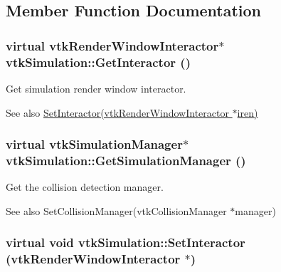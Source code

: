 \subsection{Member Function Documentation}
\hypertarget{classvtkSimulation_a80ce57f6226a646fd8faf2fac1767a64}{
\subsubsection[{GetInteractor}]{\setlength{\rightskip}{0pt plus 5cm}virtual vtkRenderWindowInteractor$\ast$ vtkSimulation::GetInteractor ()}}
\label{classvtkSimulation_a80ce57f6226a646fd8faf2fac1767a64}


Get simulation render window interactor. 

\begin{DoxySeeAlso}{See also}
\hyperlink{classvtkSimulation_ac735eaac690e6ca27d5c64131f495a26}{SetInteractor(vtkRenderWindowInteractor $\ast$iren)} 
\end{DoxySeeAlso}
\hypertarget{classvtkSimulation_a5f70409301819a5e0f725c49c1a6207f}{
\subsubsection[{GetSimulationManager}]{\setlength{\rightskip}{0pt plus 5cm}virtual {\bf vtkSimulationManager}$\ast$ vtkSimulation::GetSimulationManager ()}}
\label{classvtkSimulation_a5f70409301819a5e0f725c49c1a6207f}


Get the collision detection manager. 

\begin{DoxySeeAlso}{See also}
SetCollisionManager(vtkCollisionManager $\ast$manager) 
\end{DoxySeeAlso}
\hypertarget{classvtkSimulation_ac735eaac690e6ca27d5c64131f495a26}{
\subsubsection[{SetInteractor}]{\setlength{\rightskip}{0pt plus 5cm}virtual void vtkSimulation::SetInteractor (vtkRenderWindowInteractor $\ast$)}}
\label{classvtkSimulation_ac735eaac690e6ca27d5c64131f495a26}


